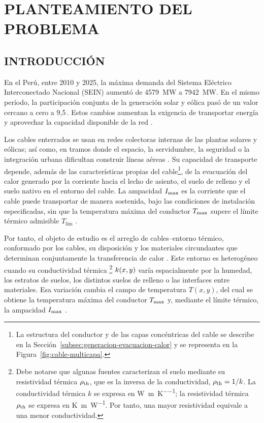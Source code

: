 \chapter{PLANTEAMIENTO DEL PROBLEMA}
\thispagestyle{empty}

\section{INTRODUCCIÓN}
\label{sec:diagnostico}

En el Perú, entre 2010 y 2025, la máxima demanda del Sistema Eléctrico Interconectado Nacional (SEIN) aumentó de \SI{4579}{\mega\watt} a \SI{7942}{\mega\watt}. En el mismo período, la participación conjunta de la generación solar y eólica pasó de un valor cercano a cero a 9,5\,\pct{}. Estos cambios aumentan la exigencia de transportar energía y aprovechar la capacidad disponible de la red \parencites{minem2025anuario2024}{minem2025indicadoresDiciembre}{coesMaximaDemanda}{iea2025transmissiongrid}.

Los cables enterrados se usan en redes colectoras internas de las plantas solares y eólicas; así como, en tramos donde el espacio, la servidumbre, la seguridad o la integración urbana dificultan construir líneas aéreas \parencite{cigre2023overheadLines}. Su capacidad de transporte depende, además de las características propias del cable\footnote{La estructura del conductor y de las capas concéntricas del cable se describe en la Sección~\ref{subsec:generacion-evacuacion-calor} y se representa en la Figura~\ref{fig:cable-multicapa}.}, de la evacuación del calor generado por la corriente hacia el lecho de asiento, el suelo de relleno y el suelo nativo en el entorno del cable. La ampacidad \(I_{\max}\) es la corriente que el cable puede transportar de manera sostenida, bajo las condiciones de instalación especificadas, sin que la temperatura máxima del conductor \(T_{\max}\) supere el límite térmico admisible \(T_{\mathrm{lim}}\) \parencites[cláusulas~4--5]{iec60287}[3--5]{enescu2020}.

Por tanto, el objeto de estudio es el arreglo de cables--entorno térmico, conformado por los cables, su disposición y los materiales circundantes que determinan conjuntamente la transferencia de calor \parencites[1--3]{enescu2020}[41--42]{cigre2025}. Este entorno es heterogéneo cuando su conductividad térmica \footnote{Debe notarse que algunas fuentes caracterizan el suelo mediante su resistividad térmica \(\rho_{\mathrm{th}}\), que es la inversa de la conductividad, \(\rho_{\mathrm{th}}=1/k\). La conductividad térmica $k$ se expresa en \si{\watt\per\metre\per\kelvin}; la resistividad térmica $\rho_{\mathrm{th}}$ se expresa en \si{\kelvin\metre\per\watt}. Por tanto, una mayor resistividad equivale a una menor conductividad.} \(k(x,y)\) varía espacialmente por la humedad, los estratos de suelos, los distintos suelos de relleno o las interfaces entre materiales. Esa variación cambia el campo de temperatura \(T(x,y)\), del cual se obtiene la temperatura máxima del conductor \(T_{\max}\) y, mediante el límite térmico, la ampacidad \(I_{\max}\) \parencites[3--4]{enescu2021}[1,6--7]{khumalo2025}[3]{xing2023}.

